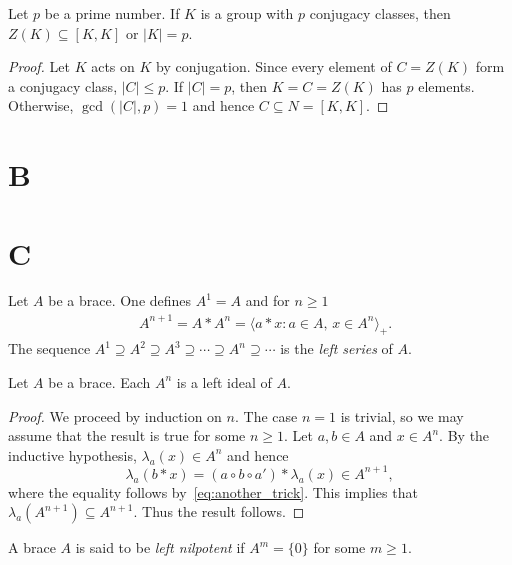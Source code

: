 \begin{corollary}
  Let $p$ be a prime number. If $K$ is a group with $p$ conjugacy classes, then 
  $Z(K)\subseteq[K,K]$ or $|K|=p$. 
\end{corollary}

\begin{proof}
  Let $K$ acts on $K$ by conjugation. Since every element of $C=Z(K)$
  form a conjugacy class, $|C|\leq p$. If $|C|=p$, then $K=C=Z(K)$
  has $p$ elements. Otherwise, $\gcd(|C|,p)=1$ and hence $C\subseteq
  N=[K,K]$.
\end{proof}



\section*{{{\thesection}B}}


\section*{{{\thesection}C}}


\begin{definition}
Let $A$ be a brace. One defines
$A^1=A$ and for $n\geq1$
\begin{align*}
    & A^{n+1}=A*A^{n}=\langle a*x: a\in A,\,x\in A^{n}\rangle_+.
\end{align*}
The sequence $A^1\supseteq A^2\supseteq A^3\supseteq\cdots\supseteq A^n\supseteq\cdots$
is the \emph{left series} of $A$.
\end{definition}

\begin{proposition}
    \label{pro:left_series}
    Let $A$ be a brace. Each $A^{n}$ is a left ideal of $A$.
\end{proposition}

\begin{proof}
    We proceed by induction on $n$. The case $n=1$ is trivial, so we may assume
    that the result is true for some $n\geq1$. Let $a,b\in A$ and $x\in A^n$.
    By the inductive hypothesis, $\lambda_a(x)\in A^n$ and hence
    \[
        \lambda_a(b*x)=(a\circ b\circ a')*\lambda_a(x)\in A^{n+1},
    \]
where the equality follows by~\eqref{eq:another_trick}. This implies
that $\lambda_a(A^{n+1})\subseteq A^{n+1}$. Thus the result
follows.
\end{proof}

\begin{definition}
    A brace $A$ is said to be \emph{left nilpotent} if $A^{m}=\{0\}$ for some
    $m\geq1$.
\end{definition}

